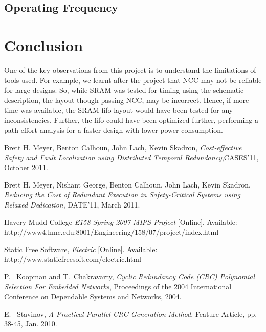 \documentclass[10pt,journal,compsoc]{IEEEtran}
\begin{document}
\subsection{Operating Frequency}


\section{Conclusion}
One of the key observations from this project is to understand the limitations of tools used. For example, we learnt after the project that NCC may not be reliable for large designs. So, while SRAM was tested for timing using the schematic description, the layout though passing NCC, may be incorrect. Hence, if more time was available, the SRAM fifo layout would have been tested for any inconsistencies. Further, the fifo could have been optimized further, performing a path effort analysis for a faster design with lower power consumption. 




\begin{thebibliography}{1}


 Brett H. Meyer, Benton Calhoun, John Lach, Kevin Skadron, \emph{Cost-effective Safety and Fault Localization using Distributed Temporal Redundancy},CASES'11, October 2011.

Brett H. Meyer, Nishant George, Benton Calhoun, John Lach, Kevin Skadron, \emph{Reducing the Cost of Redundant Execution in Safety-Critical Systems using Relaxed Dedication}, DATE'11, March 2011.

Havery Mudd College \emph{E158 Spring 2007 MIPS Project} [Online]. Available: http://www4.hmc.edu:8001/Engineering/158/07/project/index.html

Static Free Software, \emph{Electric} [Online]. Available: http://www.staticfreesoft.com/electric.html

P. ~Koopman and T.~Chakravarty, \emph{Cyclic Redundancy Code ({CRC}) Polynomial Selection For Embedded Networks}, Proceedings of the 2004 International Conference on Dependable Systems and Networks, 2004.

E. ~Stavinov, \emph{A Practical Parallel {CRC} Generation Method}, Feature Article, pp. 38-45, Jan. 2010. 

\end{thebibliography}









\end{document}
